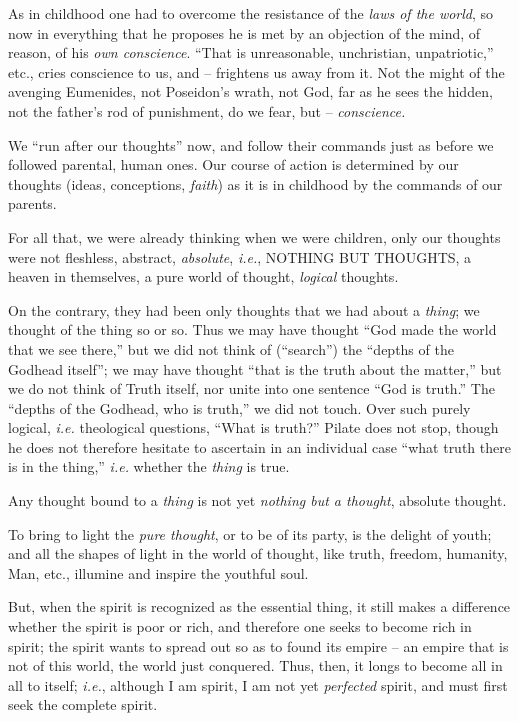 As in childhood one had to overcome the resistance of the \textit{laws of the 
world}, so now in everything that he proposes he is met by an objection of the 
mind, of reason, of his \textit{own conscience}. ``That is unreasonable, 
unchristian, unpatriotic,'' etc., cries conscience to us, and -- frightens us 
away from it. Not the might of the avenging Eumenides, not Poseidon's wrath, 
not God, far as he sees the hidden, not the father's rod of punishment, do we 
fear, but -- \textit{conscience.}

We ``run after our thoughts'' now, and follow their commands just as before 
we followed parental, human ones. Our course of action is determined by our 
thoughts (ideas, conceptions, \textit{faith}) as it is in childhood by the 
commands of our parents.

For all that, we were already thinking when we were children, only our 
thoughts were not fleshless, abstract, \textit{absolute}, \textit{i.e.}, 
NOTHING BUT THOUGHTS, a heaven in themselves, a pure world of thought, 
\textit{logical} thoughts.

On the contrary, they had been only thoughts that we had about a 
\textit{thing}; we thought of the thing so or so. Thus we may have thought 
``God made the world that we see there,'' but we did not think of 
(``search'') the ``depths of the Godhead itself''; we may have thought 
``that is the truth about the matter,'' but we do not think of Truth itself, 
nor unite into one sentence ``God is truth.'' The ``depths of the Godhead, 
who is truth,'' we did not touch. Over such purely logical, \textit{i.e.} 
theological questions, ``What is truth?'' Pilate does not stop, though he 
does not therefore hesitate to ascertain in an individual case ``what truth 
there is in the thing,'' \textit{i.e.} whether the \textit{thing} is true.

Any thought bound to a \textit{thing} is not yet \textit{nothing but a 
thought}, absolute thought.

To bring to light the \textit{pure thought}, or to be of its party, is the 
delight of youth; and all the shapes of light in the world of thought, like 
truth, freedom, humanity, Man, etc., illumine and inspire the youthful soul.

But, when the spirit is recognized as the essential thing, it still makes a 
difference whether the spirit is poor or rich, and therefore one seeks to 
become rich in spirit; the spirit wants to spread out so as to found its 
empire -- an empire that is not of this world, the world just conquered. Thus, 
then, it longs to become all in all to itself; \textit{i.e.}, although I am 
spirit, I am not yet \textit{perfected} spirit, and must first seek the 
complete spirit.

